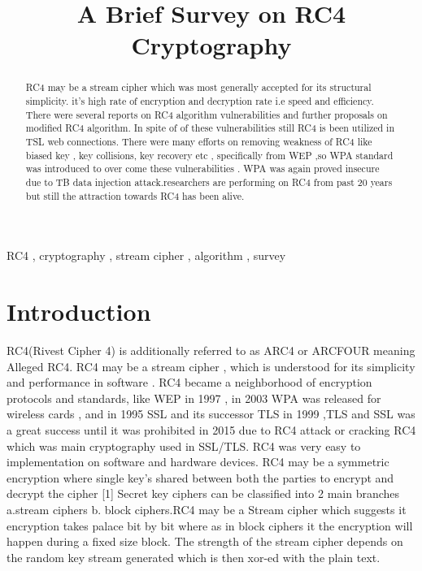 \documentclass[conference]{IEEEtran}
\begin{document}
\title{A Brief Survey on RC4  Cryptography
}

\author{

}

\maketitle

\begin{abstract}
RC4 may be a stream cipher which was most generally accepted for its structural simplicity. it's high rate of encryption and decryption rate i.e speed and efficiency.
There were several reports on RC4 algorithm vulnerabilities and further proposals on modified RC4 algorithm. In spite of of these vulnerabilities still RC4 is been utilized in TSL web connections.
There were many efforts on removing weakness of RC4 like biased key , key collisions, key recovery etc , specifically from WEP ,so WPA standard was introduced to over come these vulnerabilities . WPA was again proved insecure due to TB data injection attack.researchers are performing on RC4 from past 20 years but still the attraction towards RC4 has been alive.
 
\end{abstract}

\begin{IEEEkeywords}
RC4 , cryptography , stream cipher , algorithm , survey  
\end{IEEEkeywords}



\section{Introduction}
RC4(Rivest Cipher 4) is additionally referred to as ARC4 or ARCFOUR meaning Alleged RC4. RC4 may be a stream cipher , which is understood for its simplicity and performance in software . RC4 became a neighborhood of encryption protocols and standards, like WEP in 1997 , in 2003 WPA was released for wireless cards , and in 1995 SSL  and its successor TLS in 1999 ,TLS and SSL was a great success  until it was prohibited in 2015 due to RC4 attack or cracking RC4 which was main cryptography used in SSL/TLS. RC4 was very easy to implementation on software and hardware devices.
RC4 may be a symmetric encryption where single key's shared between both the parties to encrypt and decrypt the cipher [1]
Secret key ciphers can be classified into 2 main branches  \newline a.stream ciphers \newline b. block ciphers.RC4 may be a Stream cipher which suggests it encryption takes palace bit by bit where as in block ciphers it the encryption will happen during a fixed size block.
The strength of the stream cipher depends on the random key stream generated which is then xor-ed with the plain text. 
\end{document}

